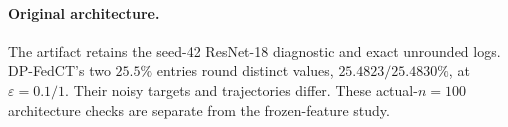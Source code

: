 \paragraph{Original architecture.}
The artifact retains the seed-42 ResNet-18 diagnostic and exact unrounded
logs. DP-FedCT's two $25.5\%$ entries round distinct values,
$25.4823/25.4830\%$, at $\varepsilon=0.1/1$. Their noisy targets and
trajectories differ. These actual-$n=100$ architecture checks are separate
from the frozen-feature study.
